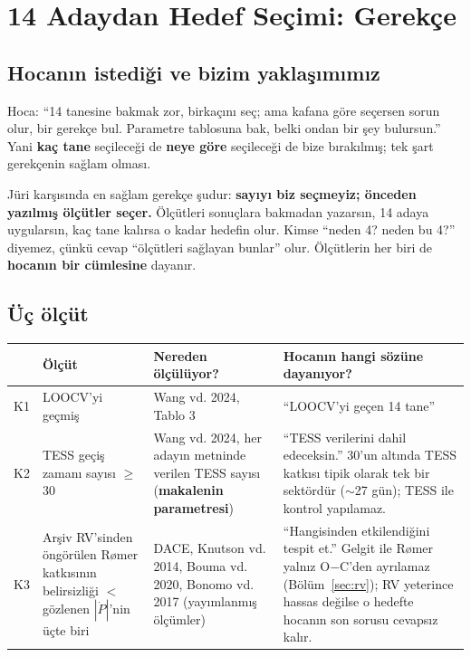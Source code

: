 \section{14 Adaydan Hedef Seçimi: Gerekçe}
\label{sec:secim}

\subsection{Hocanın istediği ve bizim yaklaşımımız}
Hoca: “14 tanesine bakmak zor, birkaçını seç; ama kafana göre seçersen sorun olur, bir gerekçe bul. Parametre
tablosuna bak, belki ondan bir şey bulursun.” Yani \textbf{kaç tane} seçileceği de \textbf{neye göre} seçileceği de bize
bırakılmış; tek şart gerekçenin sağlam olması.

Jüri karşısında en sağlam gerekçe şudur: \textbf{sayıyı biz seçmeyiz; önceden yazılmış ölçütler seçer.} Ölçütleri
sonuçlara bakmadan yazarsın, 14 adaya uygularsın, kaç tane kalırsa o kadar hedefin olur. Kimse “neden 4? neden bu
4?” diyemez, çünkü cevap “ölçütleri sağlayan bunlar” olur. Ölçütlerin her biri de \textbf{hocanın bir cümlesine}
dayanır.

\subsection{Üç ölçüt}
\begin{center}
\begin{tabularx}{\textwidth}{c >{\raggedright\arraybackslash}X >{\raggedright\arraybackslash}X >{\raggedright\arraybackslash}X}
\toprule
 & Ölçüt & Nereden ölçülüyor? & Hocanın hangi sözüne dayanıyor?\\
\midrule
K1 & LOOCV'yi geçmiş & Wang vd. 2024, Tablo 3 & “LOOCV'yi geçen 14 tane”\\
K2 & TESS geçiş zamanı sayısı $\ge$ 30 & Wang vd. 2024, her adayın metninde verilen TESS sayısı (\textbf{makalenin parametresi}) &
  “TESS verilerini dahil edeceksin.” 30'un altında TESS katkısı tipik olarak tek bir sektördür ($\sim$27 gün); TESS ile kontrol yapılamaz.\\
K3 & Arşiv RV'sinden öngörülen Rømer katkısının belirsizliği $<$ gözlenen $|\dot P|$'nin üçte biri & DACE, Knutson vd. 2014,
  Bouma vd. 2020, Bonomo vd. 2017 (yayımlanmış ölçümler) & “Hangisinden etkilendiğini tespit et.” Gelgit ile Rømer yalnız
  O$-$C'den ayrılamaz (Bölüm~\ref{sec:rv}); RV yeterince hassas değilse o hedefte hocanın son sorusu cevapsız kalır.\\
\bottomrule
\end{tabularx}
\end{center}

